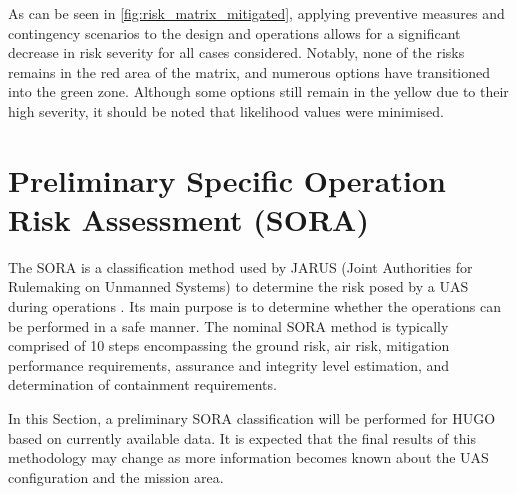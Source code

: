 As can be seen in \autoref{fig:risk_matrix_mitigated}, applying preventive measures and contingency scenarios to the design and operations allows for a significant decrease in risk severity for all cases considered. Notably, none of the risks remains in the red area of the matrix, and numerous options have transitioned into the green zone. Although some options still remain in the yellow due to their high severity, it should be noted that likelihood values were minimised.


\section{Preliminary Specific Operation Risk Assessment (SORA)}
\label{sec:SORA}

The SORA is a classification method used by JARUS (Joint Authorities for Rulemaking on Unmanned Systems) to determine the risk posed by a UAS during operations \cite{Jarus_main}. Its main purpose is to determine whether the operations can be performed in a safe manner. The nominal SORA method is typically comprised of 10 steps encompassing the ground risk, air risk, mitigation performance requirements, assurance and integrity level estimation, and determination of containment requirements.

In this Section, a preliminary SORA classification will be performed for HUGO based on currently available data. It is expected that the final results of this methodology may change as more information becomes known about the UAS configuration and the mission area.

